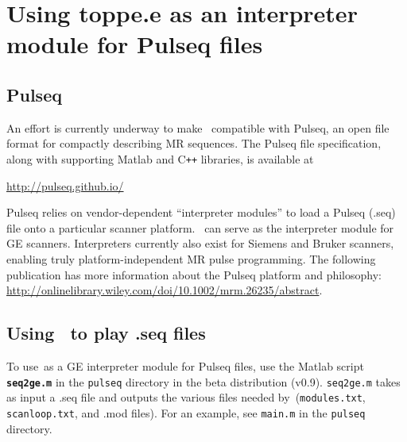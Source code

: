 
\chapter{Using toppe.e as an interpreter module for Pulseq files}
\label{ch:pulseq}

\section{Pulseq}
An effort is currently underway to make \toppe~compatible with Pulseq, an open file format for compactly describing MR sequences.
The Pulseq file specification, along with supporting Matlab and C\texttt{++} libraries, is available at
\begin{center}
\url{http://pulseq.github.io/}
\end{center}
Pulseq relies on vendor-dependent ``interpreter modules'' to load a Pulseq (.seq) file onto a particular scanner platform.
\toppe~can serve as the interpreter module for GE scanners.
Interpreters currently also exist for Siemens and Bruker scanners, enabling truly platform-independent MR pulse programming.
The following publication has more information about the Pulseq platform and philosophy: \url{http://onlinelibrary.wiley.com/doi/10.1002/mrm.26235/abstract}.


\section{Using \toppe~to play .seq files}
To use\toppe~as a GE interpreter module for Pulseq files, use the Matlab script {\tt \bf seq2ge.m} in the {\tt pulseq} directory in the beta distribution (v0.9).
{\tt seq2ge.m} takes as input a .seq file and outputs the various files needed by\toppe~({\tt modules.txt}, {\tt scanloop.txt}, and .mod files).
For an example, see \texttt{main.m} in the \texttt{pulseq} directory.

